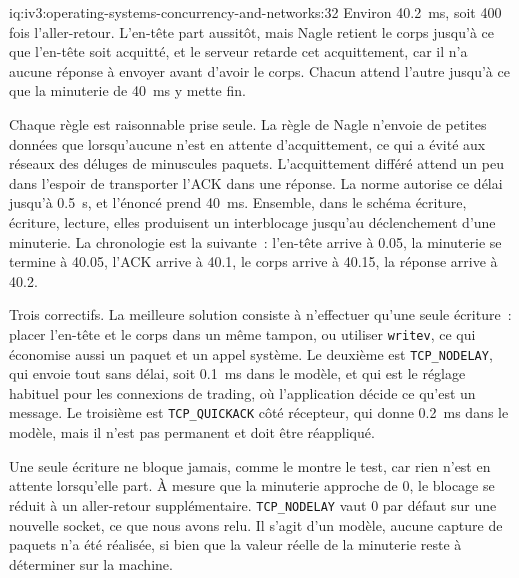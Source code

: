 \begin{solution}{iq:iv3:operating-systems-concurrency-and-networks:32}
Environ 40.2~ms, soit 400 fois l'aller-retour. L'en-tête part aussitôt, mais Nagle retient le corps jusqu'à ce que l'en-tête soit acquitté, et le serveur retarde cet acquittement, car il n'a aucune réponse à envoyer avant d'avoir le corps. Chacun attend l'autre jusqu'à ce que la minuterie de 40~ms y mette fin.
\label{lst:iv3:os:nagle}

Chaque règle est raisonnable prise seule. La règle de Nagle n'envoie de petites données que lorsqu'aucune n'est en attente d'acquittement, ce qui a évité aux réseaux des déluges de minuscules paquets. L'acquittement différé attend un peu dans l'espoir de transporter l'ACK dans une réponse. La norme autorise ce délai jusqu'à 0.5~s, et l'énoncé prend 40~ms. Ensemble, dans le schéma écriture, écriture, lecture, elles produisent un interblocage jusqu'au déclenchement d'une minuterie. La chronologie est la suivante~: l'en-tête arrive à 0.05, la minuterie se termine à 40.05, l'ACK arrive à 40.1, le corps arrive à 40.15, la réponse arrive à 40.2.

Trois correctifs. La meilleure solution consiste à n'effectuer qu'une seule écriture~: placer l'en-tête et le corps dans un même tampon, ou utiliser \texttt{writev}, ce qui économise aussi un paquet et un appel système. Le deuxième est \texttt{TCP\_NODELAY}, qui envoie tout sans délai, soit 0.1~ms dans le modèle, et qui est le réglage habituel pour les connexions de trading, où l'application décide ce qu'est un message. Le troisième est \texttt{TCP\_QUICKACK} côté récepteur, qui donne 0.2~ms dans le modèle, mais il n'est pas permanent et doit être réappliqué.

Une seule écriture ne bloque jamais, comme le montre le test, car rien n'est en attente lorsqu'elle part. À mesure que la minuterie approche de 0, le blocage se réduit à un aller-retour supplémentaire. \texttt{TCP\_NODELAY} vaut 0 par défaut sur une nouvelle socket, ce que nous avons relu. Il s'agit d'un modèle, aucune capture de paquets n'a été réalisée, si bien que la valeur réelle de la minuterie reste à déterminer sur la machine.

\end{solution}

